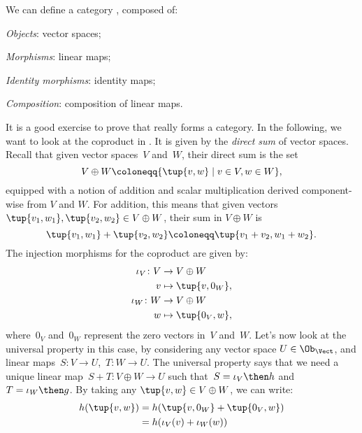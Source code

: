 \begin{example}
We can define a category \Vect, composed of: 
\begin{compactitem}
\item \emph{Objects}: vector spaces;
\item \emph{Morphisms}: linear maps;
\item \emph{Identity morphisms}: identity maps;
\item \emph{Composition}: composition of linear maps.
\end{compactitem}
It is a good exercise to prove that \Vect really forms a category. In the following, we want to look at the coproduct in \Vect. It is given by the \emph{direct sum} of vector spaces. Recall that given vector spaces~$V$ and~$W$, their direct sum is the set
\begin{equation*}
    V\oplus W\coloneqq \{\tup{v,w}\mid v\in V,w\in W\},
\end{equation*}
equipped with a notion of addition and scalar multiplication derived component-wise from $V$ and $W$. For addition, this means that given vectors~$\tup{v_1,w_1},\tup{v_2,w_2}\in V\oplus W$, their sum in $V \oplus W$ is
\begin{equation*}
    \tup{v_1,w_1}+\tup{v_2,w_2}\coloneqq \tup{v_1+v_2,w_1+w_2}.
\end{equation*}
The injection morphisms for the coproduct are given by:
\begin{equation*}
    \begin{aligned}
    \iota_V\colon V&\to V\oplus W\\
    v&\mapsto \tup{v,0_W},\\
    \iota_W\colon W&\to V\oplus W\\
    w&\mapsto \tup{0_V,w},
    \end{aligned}
\end{equation*}
where~$0_V$ and~$0_W$ represent the zero vectors in~$V$ and~$W$. Let's now look at the universal property in this case, by considering any vector space $U\in \Ob_\Vect$, and linear maps~$S\colon V\to U$,~$T\colon W\to U$. The universal property says that we need a unique linear map~$S+T\colon V\oplus W \to U$ such that~$S=\iota_V\then h$ and~$T=\iota_W\then g$. By taking any $\tup{v,w}\in V\oplus W$, we can write:
\begin{equation*}
    \begin{aligned}
    h(\tup{v,w})&=h(\tup{v,0_W}+\tup{0_V,w})\\
    &=h(\iota_V(v)+\iota_W(w)) \\

\end{aligned}
\end{equation*}
\end{example}
